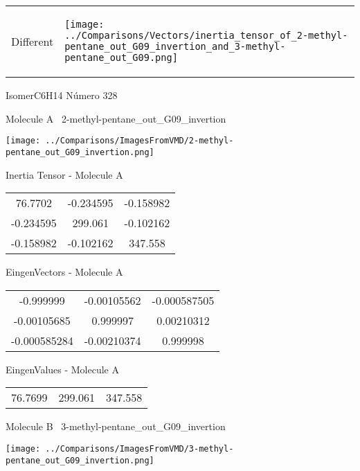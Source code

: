 \vtab[-5mm]
\begin{tabular}{*{2}{m{}}}
\begin{center}
\textcolor{NavyBlue}{\Large Different}
\end{center}
&
\begin{center}
\texttt{[image: ../Comparisons/Vectors/inertia\_tensor\_of\_2-methyl-pentane\_out\_G09\_invertion\_and\_3-methyl-pentane\_out\_G09.png]}
\end{center}
\end{tabular}

 \newpage

\vtab[-3cm]
\begin{center}
{\large IsomerC6H14 \tab Número 328}
\end{center}
\begin{multicols}{2}
\begin{center}

Molecule A \
2-methyl-pentane\_out\_G09\_invertion

\texttt{[image: ../Comparisons/ImagesFromVMD/2-methyl-pentane\_out\_G09\_invertion.png]}

Inertia Tensor - Molecule A \\
\begin{tabular}{|c c c|}
76.7702	 & 	-0.234595	 & 	-0.158982	 \\
-0.234595	 & 	299.061	 & 	-0.102162	 \\
-0.158982	 & 	-0.102162	 & 	347.558
\end{tabular}

\vtab
 EingenVectors - Molecule A     \\
\begin{tabular}{|c c c|}
-0.999999	 & 	-0.00105562	 & 	-0.000587505	 \\
-0.00105685	 & 	0.999997	 & 	0.00210312	 \\
-0.000585284	 & 	-0.00210374	 & 	0.999998
\end{tabular}

\vtab
 EingenValues - Molecule A     \\
\begin{tabular}{|c c c|}
76.7699	 & 	299.061	 & 	347.558	 \\
\end{tabular}
\columnbreak

Molecule B \
3-methyl-pentane\_out\_G09\_invertion

\texttt{[image: ../Comparisons/ImagesFromVMD/3-methyl-pentane\_out\_G09\_invertion.png]}


\end{center}
\end{multicols}
